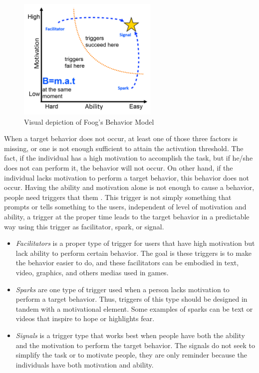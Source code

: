 \begin{figure}[htb]
 \caption{Visual depiction of Foog's Behavior Model}
 \label{fig:foggs-behavior-model}
 \centering
 \includegraphics[width=0.6\textwidth]{images/chap-general-background/foggs-behavior-model.png}
\end{figure}

When a target behavior does not occur, at least one of those three factors is missing, or one is not enough sufficient to attain the activation threshold.
The fact, if the individual has a high motivation to accomplish the task, but if he/she does not can perform it, the behavior will not occur.
On other hand, if the individual lacks motivation to perform a target behavior, this behavior does not occur.
Having the ability and motivation alone is not enough to cause a behavior, people need triggers that them  \cite{Fogg2009}.
This trigger is not simply something that prompts or tells something to the users, independent of level of motivation and ability, a trigger at the proper time leads to the target behavior in a predictable way using this trigger as facilitator, spark, or signal.

\begin{itemize}
\item \emph{Facilitators} is a proper type of trigger for users that have high motivation but lack ability to perform certain behavior.
The goal is these triggers is to make the behavior easier to do, and these facilitators can be embodied in text, video, graphics, and others medias used in games.

\item \emph{Sparks} are one type of trigger used when a person lacks motivation to perform a target behavior.
Thus, triggers of this type should be designed in tandem with a motivational element. Some examples of sparks can be text or videos that inspire to hope or highlights fear.

\item \emph{Signals} is a trigger type that works best when people have both the ability and the motivation to perform the target behavior.
The signals do not seek to simplify the task or to motivate people, they are only reminder because the individuals have both motivation and ability.
\end{itemize}

